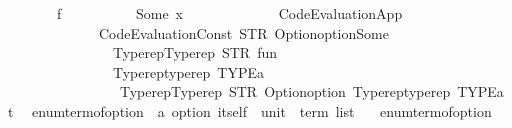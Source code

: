 \begin{isabellebody}
\ \ \ \ \ \ \ \ f\isanewline
\ \ \ \ \ \ \ \ \ \ {\isacharparenleft}{\kern0pt}Some\ x{\isacharcomma}{\kern0pt}\isanewline
\ \ \ \ \ \ \ \ \ \ \ \ {\isasymlambda}{\isacharunderscore}{\kern0pt}{\isachardot}{\kern0pt}\ Code{\isacharunderscore}{\kern0pt}Evaluation{\isachardot}{\kern0pt}App\isanewline
\ \ \ \ \ \ \ \ \ \ \ \ \ \ {\isacharparenleft}{\kern0pt}Code{\isacharunderscore}{\kern0pt}Evaluation{\isachardot}{\kern0pt}Const\ {\isacharparenleft}{\kern0pt}STR\ {\isacharprime}{\kern0pt}{\isacharprime}{\kern0pt}Option{\isachardot}{\kern0pt}option{\isachardot}{\kern0pt}Some{\isacharprime}{\kern0pt}{\isacharprime}{\kern0pt}{\isacharparenright}{\kern0pt}\isanewline
\ \ \ \ \ \ \ \ \ \ \ \ \ \ \ \ {\isacharparenleft}{\kern0pt}Typerep{\isachardot}{\kern0pt}Typerep\ {\isacharparenleft}{\kern0pt}STR\ {\isacharprime}{\kern0pt}{\isacharprime}{\kern0pt}fun{\isacharprime}{\kern0pt}{\isacharprime}{\kern0pt}{\isacharparenright}{\kern0pt}\isanewline
\ \ \ \ \ \ \ \ \ \ \ \ \ \ \ \ {\isacharbrackleft}{\kern0pt}Typerep{\isachardot}{\kern0pt}typerep\ TYPE{\isacharparenleft}{\kern0pt}{\isacharprime}{\kern0pt}a{\isacharparenright}{\kern0pt}{\isacharcomma}{\kern0pt}\isanewline
\ \ \ \ \ \ \ \ \ \ \ \ \ \ \ \ \ Typerep{\isachardot}{\kern0pt}Typerep\ {\isacharparenleft}{\kern0pt}STR\ {\isacharprime}{\kern0pt}{\isacharprime}{\kern0pt}Option{\isachardot}{\kern0pt}option{\isacharprime}{\kern0pt}{\isacharprime}{\kern0pt}{\isacharparenright}{\kern0pt}\ {\isacharbrackleft}{\kern0pt}Typerep{\isachardot}{\kern0pt}typerep\ TYPE{\isacharparenleft}{\kern0pt}{\isacharprime}{\kern0pt}a{\isacharparenright}{\kern0pt}{\isacharbrackright}{\kern0pt}{\isacharbrackright}{\kern0pt}{\isacharparenright}{\kern0pt}{\isacharparenright}{\kern0pt}\ {\isacharparenleft}{\kern0pt}t\ {\isacharparenleft}{\kern0pt}{\isacharparenright}{\kern0pt}{\isacharparenright}{\kern0pt}{\isacharparenright}{\kern0pt}{\isacharparenright}{\kern0pt}{\isachardoublequoteclose}\isanewline
\isanewline
{}\isamarkupfalse%
\ enum{\isacharunderscore}{\kern0pt}term{\isacharunderscore}{\kern0pt}of{\isacharunderscore}{\kern0pt}option\ {\isacharcolon}{\kern0pt}{\isacharcolon}{\kern0pt}\ {\isachardoublequoteopen}{\isacharprime}{\kern0pt}a\ option\ itself\ {\isasymRightarrow}\ unit\ {\isasymRightarrow}\ term\ list{\isachardoublequoteclose}\isanewline
\ \ \ {\isachardoublequoteopen}enum{\isacharunderscore}{\kern0pt}term{\isacharunderscore}{\kern0pt}of{\isacharunderscore}{\kern0pt}option\ {\isacharequal}{\kern0pt}\isanewline
\ \ \ \ {\isacharparenleft}{\kern0pt}{\isasymlambda}\ {\isacharunderscore}{\kern0pt}\ {\isacharunderscore}{\kern0pt}{\isachardot}{\kern0pt}\isanewline

\end{isabellebody}
